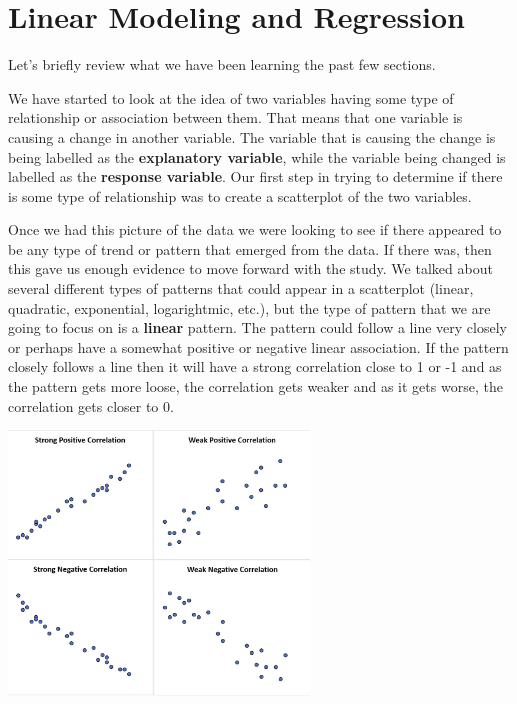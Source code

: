 \documentclass[
  letterpaper,
  DIV=11,
  numbers=noendperiod]{scrreprt}
\begin{document}

\chapter*{Linear Modeling and
Regression}\label{linear-modeling-and-regression}


Let's briefly review what we have been learning the past few sections.

We have started to look at the idea of two variables having some type of
relationship or association between them. That means that one variable
is causing a change in another variable. The variable that is causing
the change is being labelled as the \textbf{explanatory variable}, while
the variable being changed is labelled as the \textbf{response
variable}. Our first step in trying to determine if there is some type
of relationship was to create a scatterplot of the two variables.

Once we had this picture of the data we were looking to see if there
appeared to be any type of trend or pattern that emerged from the data.
If there was, then this gave us enough evidence to move forward with the
study. We talked about several different types of patterns that could
appear in a scatterplot (linear, quadratic, exponential, logarightmic,
etc.), but the type of pattern that we are going to focus on is a
\textbf{linear} pattern. The pattern could follow a line very closely or
perhaps have a somewhat positive or negative linear association. If the
pattern closely follows a line then it will have a strong correlation
close to 1 or -1 and as the pattern gets more loose, the correlation
gets weaker and as it gets worse, the correlation gets closer to 0.

\includegraphics[width=0.6\textwidth,height=\textheight]{./images/LMR_1.jpg}
\end{document}
